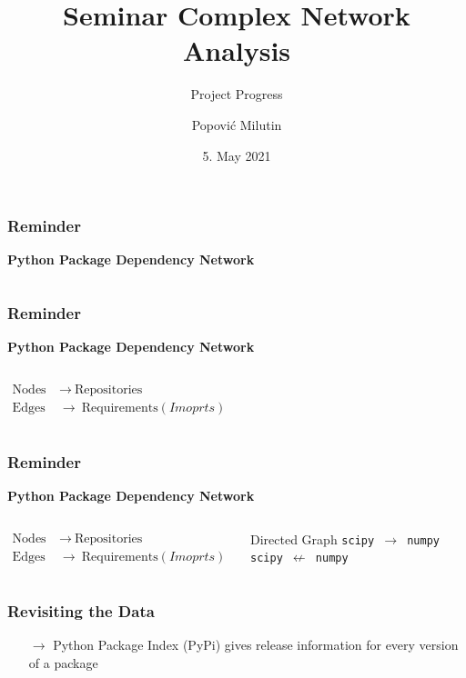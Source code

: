 \documentclass[fleqn]{beamer}
\title
{Seminar Complex Network Analysis}
\subtitle{Project Progress}
\author[Popović Milutin]
{Popović Milutin}
\date{5. May 2021}
\begin{document}
    \begin{frame}
        \titlepage
    \end{frame}

    \begin{frame}
        \frametitle{Reminder}
        \centering
        \textbf{Python Package Dependency Network}
        \vspace{1cm}
        \begin{columns}[T]
        \end{columns}
    \end{frame}

    \begin{frame}
        \frametitle{Reminder}
        \centering
        \textbf{Python Package Dependency Network}
        \vspace{1cm}
        \begin{columns}[T]
        \begin{align*}
            \text{Nodes}\ &\to\  \text{Repositories}\\
            \text{Edges}\ &\to\ \text{Requirements}(Imoprts)
        \end{align*}
        \end{columns}
    \end{frame}

    \begin{frame}
        \frametitle{Reminder}
        \centering
        \textbf{Python Package Dependency Network}
        \vspace{1cm}
        \begin{columns}[T]
        \begin{align*}
            \text{Nodes}\ &\to\  \text{Repositories}\\
            \text{Edges}\ &\to\ \text{Requirements}(Imoprts)
        \end{align*}
        \begin{block}{\centering Directed Graph}
            \centering \texttt{scipy $\to$ numpy}\\
            \centering \texttt{scipy $\not\gets$ numpy}
        \end{block}
        \end{columns}
    \end{frame}

    \begin{frame}
        \frametitle{Revisiting the Data}
        \begin{itemize}
            \item[$\to$] Python Package Index (PyPi) gives release
                information for every version of a package
        \end{itemize}
        \vspace{6cm}
    \end{frame}
\end{document}
